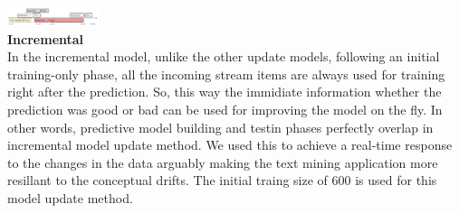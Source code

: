    \includegraphics[width=0.2\textwidth]{./time_models/Errortriggered}\\
\textbf{\large Incremental}\\
In the incremental model, unlike the other update models, following an initial training-only phase, all the incoming stream items are always used for training right after the prediction. So, this way the immidiate information whether the prediction was good or bad can be used for improving the model on the fly. In other words, predictive model building and testin phases perfectly overlap in incremental model update method. We used this to achieve a real-time response to the changes in the data arguably making the text mining application more resillant to the conceptual drifts. The initial traing size of 600 is used for this model update method.
